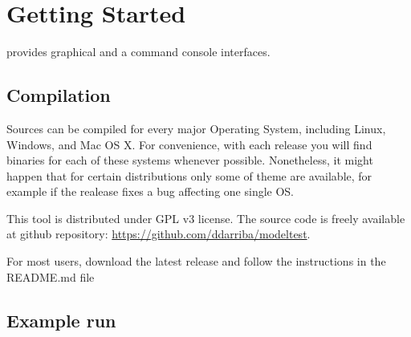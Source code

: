 \section{Getting Started}

\modeltest provides graphical and a command console interfaces.

\subsection{Compilation}

Sources can be compiled for every major Operating System, including Linux, Windows, and Mac OS X. For convenience, with each release you will find binaries for each of these systems whenever possible.
Nonetheless, it might happen that for certain distributions only some of theme are available, for example if the realease fixes a bug affecting one single OS.

This tool is distributed under GPL v3 license. 
The source code is freely available at github repository: \url{https://github.com/ddarriba/modeltest}.

For most users, download the latest release and follow the instructions in the README.md file

\subsection{Example run}

